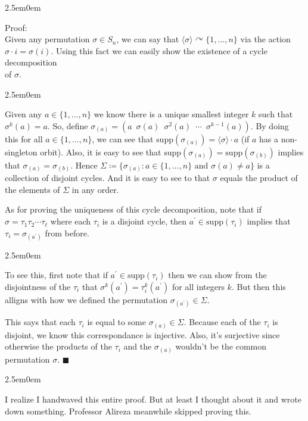 \documentclass{book}
\newcommand{\myComment}{%
   \color{RawerSienna}%
   \fontsize{12}{14}\selectfont%
}
\newcommand{\exThreeP}{%
   \color{RedViolet}%
   \fontsize{12}{14}\selectfont%
}
\newcommand{\exPPP}{%
   \color{VioletRed}%
   \fontsize{12}{14}\selectfont%
}
\newenvironment{myIndent}{%
   \begin{adjustwidth}{2.5em}{0em}%
}{%
   \end{adjustwidth}%
}
\newcommand{\gap}{\phantom{2}}
\newcommand{\supp}{\mathrm{supp}}
\newcommand{\retTwo}{\hfill\bigbreak}
\begin{document}
\begin{myIndent}\exThreeP
	Proof:\\
	Given any permutation $\sigma \in S_n$, we can say that $\langle \sigma \rangle \curvearrowright \{1, \ldots, n\}$ via the action\\ $\sigma \cdot i = \sigma(i)$. Using this fact we can easily show the existence of a cycle decomposition\\ of $\sigma$.
	\begin{myIndent}\exPPP
		Given any $a \in \{1, \ldots, n\}$ we know there is a unique smallest integer $k$ such that $\sigma^k(a) = a$. So, define $\sigma_{(a)} = (a\gap \sigma(a)\gap\sigma^2(a)\gap\cdots\gap \sigma^{k-1}(a))$. By doing this for all $a \in \{1, \ldots, n\}$, we can see that $\supp(\sigma_{(a)}) = \langle \sigma \rangle \cdot a$ (if $a$ has a non-singleton orbit). Also, it is easy to see that $\supp(\sigma_{(a)}) = \supp(\sigma_{(b)})$ implies that $\sigma_{(a)} = \sigma_{(b)}$. Hence $\Sigma \coloneqq \{\sigma_{(a)} : a \in \{1, \ldots, n\} \text{ and } \sigma(a) \neq a \}$ is a collection of disjoint cycles. And it is easy to see to that $\sigma$ equals the product of the elements of $\Sigma$ in any order.\retTwo
	\end{myIndent}

	As for proving the uniqueness of this cycle decomposition, note that if $\sigma = \tau_1 \tau_2 \cdots \tau_\ell$ where each $\tau_i$ is a disjoint cycle, then $a^\prime \in \supp(\tau_i)$ implies that $\tau_i = \sigma_{(a^\prime)}$ from before.
	\begin{myIndent}\exPPP
		To see this, first note that if $a^\prime \in \supp(\tau_i)$ then we can show from the disjointness of the $\tau_i$ that $\sigma^k(a^\prime) = \tau_i^k(a^\prime)$ for all integers $k$. But then this alligns with how we defined the permutation $\sigma_{(a^\prime)} \in \Sigma$.\newpage
	\end{myIndent}

	This says that each $\tau_i$ is equal to some $\sigma_{(a)} \in \Sigma$. Because each of the $\tau_i$ is disjoint, we know this correspondance is injective. Also, it's surjective since otherwise the products of the $\tau_i$ and the $\sigma_{(a)}$ wouldn't be the common permutation $\sigma$. $\blacksquare$\retTwo

	\begin{myIndent}\myComment
		I realize I handwaved this entire proof. But at least I thought about it and wrote down something. Professor Alireza meanwhile skipped proving this.\retTwo
	\end{myIndent}
\end{myIndent}
\end{document}
